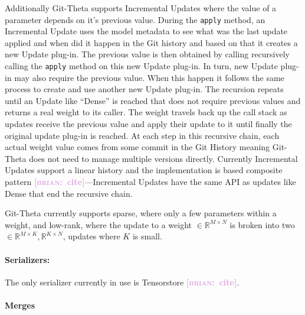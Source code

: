 \documentclass[nohyperref]{article}
\def\code#1{\texttt{#1}}
\theoremstyle{plain}
\theoremstyle{definition}
\theoremstyle{remark}
\newcommand{\brian}[1]{\textcolor{Plum}{\bf\small [\textsc{brian}:~#1]}}
\begin{document}
Additionally Git-Theta supports Incremental Updates where the value of a parameter depends on it's previous value. During the \code{apply} method, an Incremental Update uses the model metadata to see what was the last update applied and when did it happen in the Git history and based on that it creates a new Update plug-in. The previous value is then obtained by calling recursively calling the \code{apply} method on this new Update plug-in. In turn, new Update plug-in may also require the previous value. When this happen it follows the same process to create and use another new Update plug-in. The recursion repeats until an Update like ``Dense'' is reached that does not require previous values and returns a real weight to its caller. The weight travels back up the call stack as updates receive the previous value and apply their update to it until finally the original update plug-in is reached. At each step in this recursive chain, each actual weight value comes from some commit in the Git History meaning Git-Theta does not need to manage multiple versions directly. Currently Incremental Updates support a linear history and the implementation is based composite pattern \brian{cite}---Incremental Updates have the same API as updates like Dense that end the recursive chain.

Git-Theta currently supports sparse, where only a few parameters within a weight, and low-rank, where the update to a weight $\in \mathbb{R}^{M \times N}$ is broken into two $\in \mathbb{R}^{M \times K}, \mathbb{R}^{K \times N}$, updates where $K$ is small.





\paragraph{Serializers:} The only serializer currently in use is Tensorstore \brian{cite}.

\paragraph{Merges}
\end{document}
